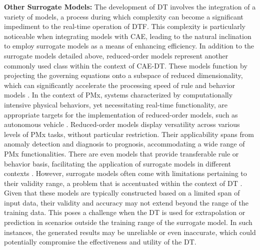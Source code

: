 \documentclass[runningheads]{llncs}
\begin{document}
\textbf{Other Surrogate Models:} The development of DT involves the integration of a variety of models, a process during which complexity can become a significant impediment to the real-time operation of DTF. This complexity is particularly noticeable when integrating models with CAE, leading to the natural inclination to employ surrogate models as a means of enhancing efficiency. In addition to the surrogate models detailed above, reduced-order models represent another commonly used class within the context of CAE-DT. These models function by projecting the governing equations onto a subspace of reduced dimensionality, which can significantly accelerate the processing speed of rule and behavior models \cite{kapteyn2020toward,aversano2021digital}. In the context of PMx, systems characterized by computationally intensive physical behaviors, yet necessitating real-time functionality, are appropriate targets for the implementation of reduced-order models, such as autonomous vehicle \cite{magargle2017simulation}. Reduced-order models display versatility across various levels of PMx tasks, without particular restriction. Their applicability spans from anomaly detection and diagnosis to prognosis, accommodating a wide range of PMx functionalities. There are even models that provide transferable rule or behavior basis, facilitating the application of surrogate models in different contexts \cite{kapteyn2022data}. However, surrogate models often come with limitations pertaining to their validity range, a problem that is accentuated within the context of DT \cite{barkanyi2021modelling}. Given that these models are typically constructed based on a limited span of input data, their validity and accuracy may not extend beyond the range of the training data. This poses a challenge when the DT is used for extrapolation or prediction in scenarios outside the training range of the surrogate model. In such instances, the generated results may be unreliable or even inaccurate, which could potentially compromise the effectiveness and utility of the DT.\\
\end{document}
